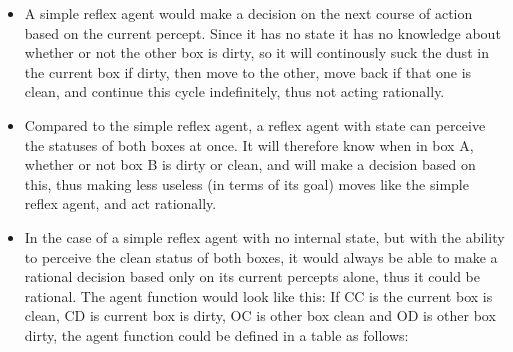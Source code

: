 \begin{enumerate}
    \begin{itemize}
    \item 
        A simple reflex agent would make a decision on the next course of
        action based on the current percept. Since it has no state it has no
        knowledge about whether or not the other box is dirty, so it will
        continously suck the dust in the current box if dirty, then move to the 
        other, move back if that one is clean, and continue this cycle
        indefinitely, thus not acting rationally.
    \item 
        Compared to the simple reflex agent, a reflex agent with state can 
        perceive the statuses of both boxes at once. It will therefore know when 
        in box A, whether or not box B is dirty or clean, and will make a 
        decision based on this, thus making less useless (in terms of its goal) 
        moves like the simple reflex agent, and act rationally.
    \item 
        In the case of a simple reflex agent with no internal state, but with 
        the ability to perceive the clean status of both boxes, it would always
        be able to make a rational decision based only on its current percepts
        alone, thus it could be rational. The agent function would look like 
        this:
            If CC is the current box is clean, CD is current box is dirty, OC is
            other box clean and OD is other box dirty, the agent function could
            be defined in a table as follows:


\end{itemize}
\end{enumerate}
